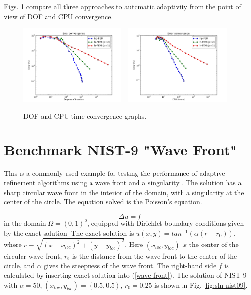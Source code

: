 \documentclass[12pt]{elsarticle}
\begin{document}

Figs. \ref{fig:nist-8-conv} compare all
three approaches to automatic adaptivity from the point
of view of DOF and CPU convergence.

\begin{figure}[!ht]
\centering
\includegraphics[height=4cm]{nist/nist-8/conv_dof_aniso.png}\ \
\includegraphics[height=4cm]{nist/nist-8/conv_cpu_aniso.png}
\caption{DOF and CPU time convergence graphs.}
\label{fig:nist-8-conv}
\end{figure}



\section{Benchmark NIST-9 "Wave Front"}
\label{sec:bench-9}

This is a commonly used example for testing the performance of
adaptive refinement algorithms using a wave front and a singularity \cite{mitchell-1, mitchell-2}.
The solution has a sharp circular wave front in the interior of the
domain, with a singularity at the center of the circle.
The equation solved is the Poisson's equation.

\begin{equation} \label{wave-front}
-\Delta u = f
\end{equation}
in the domain $\Omega = (0, 1)^2$, equipped with Dirichlet boundary conditions
given by the exact solution. The exact solution is
$u(x, y) = tan^{-1}(\alpha (r - r_{0}))$,
where $r = \sqrt{(x - x_{loc})^{2} + (y - y_{loc})^{2}}$.
Here $(x_{loc}, y_{loc})$ is the center of the circular wave front,
$r_{0}$ is the distance from the wave front to the center of the circle,
and $\alpha$ gives the steepness of the wave front.
The right-hand side $f$ is calculated by inserting exact solution into (\ref{wave-front}).
The solution of NIST-9 with $\alpha = 50$, $(x_{loc}, y_{loc}) = (0.5, 0.5)$,
$r_{0} = 0.25$ is shown in Fig. \ref{fig:sln-nist09}.
\end{document}
